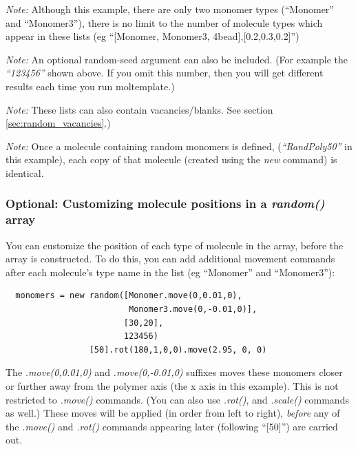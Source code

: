 \documentclass[11pt]{article}
\begin{document}
\textit{Note:}
Although this example, there are only two monomer types
(``Monomer'' and ``Monomer3''), there is no limit to the number 
of molecule types which appear in these lists (eg ``[Monomer, Monomer3, 4bead],[0.2,0.3,0.2]'')

\textit{Note:}
An optional random-seed argument can also be included.
(For example the \mbox{\textit{``123456''}} shown above.
 If you omit this number, then you will get different 
 results each time you run moltemplate.)

\textit{Note:}
These lists can also contain vacancies/blanks.
See section \ref{sec:random_vacancies}.)

\textit{Note:}
Once a molecule containing random monomers is defined, 
(\mbox{\textit{``RandPoly50''}} in this example), each copy of that molecule 
(created using the \textit{new} command) is identical.

\subsubsection*{Optional: Customizing molecule positions 
                          in a \textit{random()} array}
You can customize the position of each type of molecule in the array,
before the array is constructed.
To do this, you can add additional movement commands after 
each molecule's type name in the list (eg ``Monomer'' and ``Monomer3''):
\begin{verbatim}
  monomers = new random([Monomer.move(0,0.01,0),
                         Monomer3.move(0,-0.01,0)], 
                        [30,20],
                        123456)
                 [50].rot(180,1,0,0).move(2.95, 0, 0) 
\end{verbatim}
The \mbox{\textit{.move(0,0.01,0)}} and \mbox{\textit{.move(0,-0.01,0)}}
suffixes moves these monomers closer or further away from the
polymer axis (the x axis in this example).
This is not restricted to \mbox{\textit{.move()}} commands.
(You can also use \mbox{\textit{.rot()}}, and \mbox{\textit{.scale()}} 
commands as well.)
These moves will be applied (in order from left to right), \textit{before} 
any of the \mbox{\textit{.move()}} and \mbox{\textit{.rot()}}
commands appearing later (following ``[50]'') are carried out.
\end{document}
